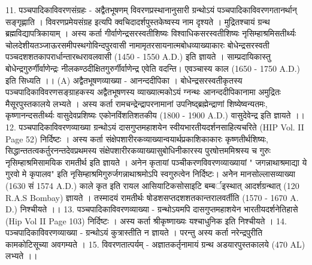 11. पञ्चपादिकाविवरणसंग्रहः - अद्वैतभूषणम् 
विवरणप्रस्थानानुसारी ग्रन्थोऽयं पञ्चपादिकाविवरणगतानर्थान् सङ्गृह्णाति । विवरणप्रमेयसंग्रह इत्यपि क्वचिदादर्शपुस्तकेष्वस्य नाम दृश्यते । मुद्रितश्चायं ग्रन्थ ब्रह्मविद्यापत्रिकायाम् । अस्य कर्ता गीर्वाणेन्द्रसरस्वतीशिष्यः विश्वाधिकसरस्वतीशिष्यः नृसिम्हाश्रमिसतीर्थ्यः चोलदेशीयतञ्जाऊरसमीपस्थगोविन्दपुरवासी नामामृतरसायनात्मबोधव्याख्याकारः बोधेन्द्रसरस्वती पञ्चदशशतकापरार्धान्तारब्धरावलवासी (1450 - 1550 A.D.) इति ज्ञायते । साम्प्रदायिकास्तु बोधेन्द्रगुरुर्गीर्वाणेन्द्रः नीलकण्ठदीक्षितगुरुर्गीर्वाणेन्द्र एवेति वदन्ति। एवञ्चास्य काल (1650 - 1750 A.D.) इति सिध्यति ।।
(A) अद्वैतभूषणव्याख्या - आनन्ददीपिका ।
बोधेन्द्रसरस्वतीकृतस्य पञ्चपादिकाविवरणसङ्ग्राहकस्य अद्वैतभूषणस्य व्याख्यात्मकोऽयं ग्नन्थः आनन्ददीपिकानामा अमुद्रितः मैसूरपुस्तकालये लभ्यते । अस्य कर्ता रामचन्द्रेन्द्रापरनामानां उपनिष्द्ब्रह्मेन्द्राणां शिष्येष्वन्यतमः, कृष्णानन्दसतीर्थ्यः वासुदेवप्रशिष्यः एकोनविंशतिशतकीय (1800 - 1900 A.D.) वासुदेवेन्द्र इति ज्ञायते ।।
12. पञ्चपादिकाविवरणव्याख्या 
ग्रन्थोऽयं दासगुप्तमहाशयेन स्वीयभारतीयदर्शनसाहित्यचरिते (HIP Vol. II Page 52) निर्दिष्टः । अस्य कर्ता संक्षेपशारीरकव्याख्यान्वयार्थप्रकाशिकाकारः कृष्णतीर्थशिष्यः, सिद्धान्ततत्वकर्तुरनन्तदेवप्रथमस्य संक्षेपशारीरकव्याख्यासुबोधिनीकारस्य पुरषोत्तममिश्रस्य च गुरुः नृसिम्हाश्रमिसामयिक रामतीर्थ इति ज्ञायते । अनेन कृतायां पञ्चीकरणविवरणव्याख्यायां " जगन्नाथाश्रमाद्या ये गुरवो मे कृपालव" इति नृसिम्हाश्रमिगुरुर्जगन्नाथाश्रमोऽपि स्वगुरुत्वेन निर्दिष्टः। अनेेन मानसोल्लासव्याख्या (1630 सं 1574 A.D.) काले कृत इति रायल आसियाटिकसोसाइटि बम्बर्इस्थात् आदर्शग्रन्थात् (120 R.A.S Bombay) ज्ञायते । तस्मादयं रामतीर्थः षोडशसप्तदशशतकान्तरालवर्तीति (1570 - 1670 A. D.) निश्चीयते ।। 
13. पञ्चपादिकाविवरणव्याख्या - 
ग्रन्थोऽयमपि दासगुप्तमहाशयेन भारतीयदर्शनेतिहासे (Hip Vol II Page 103) निर्दिष्टः । अस्य कर्ता श्रीकृष्णाख्यः यश्चाधुनिक इति निश्चीयते । 
14. पञ्चपादिकाविवरणव्याख्या - 
ग्रन्थोऽयं कुत्रास्तीति न ज्ञायते । परन्तु अस्य कर्ता नरेन्द्रपुरीति कामकोटिसूच्या अवगम्यते । 
15. विवरणतात्पर्यम् - अज्ञातकर्तृनामायं ग्रन्थ अडयारपुस्तकालये (470 AL) लभ्यते ।। 


